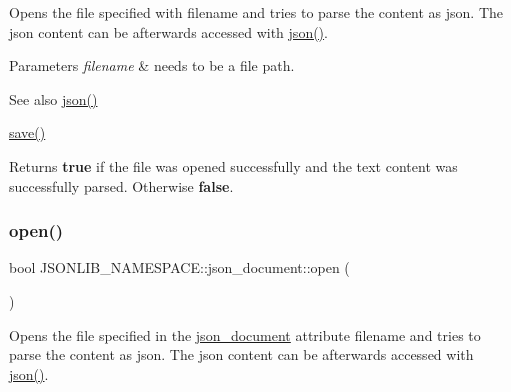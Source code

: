 Opens the file specified with {\ttfamily filename} and tries to parse the content as json. The json content can be afterwards accessed with \hyperlink{classJSONLIB__NAMESPACE_1_1json__document_ad87b8e7d68ba854dbd730758273a3b93}{json()}. 


\begin{DoxyParams}{Parameters}
{\em filename} & needs to be a file path. \\
\hline
\end{DoxyParams}
\begin{DoxySeeAlso}{See also}
\hyperlink{classJSONLIB__NAMESPACE_1_1json__document_ad87b8e7d68ba854dbd730758273a3b93}{json()} 

\hyperlink{classJSONLIB__NAMESPACE_1_1json__document_af8f392a0ffc779277ead1f2bdb222930}{save()} 
\end{DoxySeeAlso}
\begin{DoxyReturn}{Returns}
{\bfseries true} if the file was opened successfully and the text content was successfully parsed. Otherwise {\bfseries false}. 
\end{DoxyReturn}
\mbox{\label{classJSONLIB__NAMESPACE_1_1json__document_a08e509059e628742f35716dddce2d740}} 
\subsubsection{\texorpdfstring{open()}{open()}\hspace{0.1cm}{\footnotesize\ttfamily [4/4]}}
{\footnotesize\ttfamily bool J\+S\+O\+N\+L\+I\+B\+\_\+\+N\+A\+M\+E\+S\+P\+A\+C\+E\+::json\+\_\+document\+::open (\begin{DoxyParamCaption}{ }\end{DoxyParamCaption})}



Opens the file specified in the \hyperlink{classJSONLIB__NAMESPACE_1_1json__document}{json\+\_\+document} attribute {\ttfamily filename} and tries to parse the content as json. The json content can be afterwards accessed with \hyperlink{classJSONLIB__NAMESPACE_1_1json__document_ad87b8e7d68ba854dbd730758273a3b93}{json()}. 

